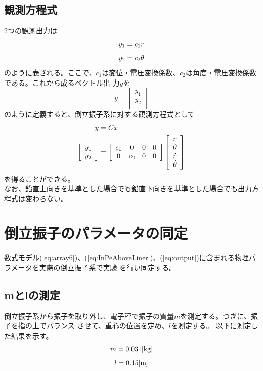 \subsection{観測方程式}
	2つの観測出力は
	\[
		y_{1} = c_{1}r\\
	\]
	\[
		y_{2} = c_{2}\theta\\
	\]
	のように表される。ここで、$c_{1}$は変位・電圧変換係数、$c_{2}$は角度・電圧変換係数である。これから成るベクトル出
	力$y$を\\
	\[
		y=\left[
		\begin{array}{c}
			y_{1}\\
			y_{2}\\
		\end{array}
		\right]
	\]
	のように定義すると、倒立振子系に対する観測方程式として\\
	\begin{align}
		y&=Cx \notag \\
		\left[
		\begin{array}{c}
			y_{1}\\
			y_{2}\\
		\end{array}
		\right]&=\left[
		\begin{array}{cccc}
			c_{1} & 0 & 0 & 0 \\
			0 & c_{2} & 0 & 0\\
		\end{array}
		\right]\left[
		\begin{array}{c}
			r\\
			\theta\\
			\dot{r}\\
			\dot{\theta}\\
		\end{array}
		\right]
		\label{eq:output}
	\end{align}
	を得ることができる。\\
	なお、鉛直上向きを基準とした場合でも鉛直下向きを基準とした場合でも出力方程式は変わらない。
\section{倒立振子のパラメータの同定}
数式モデル(\ref{eq:array6})、(\ref{eq:InPeAboveLiner})、(\ref{eq:output})に含まれる物理パラメータを実際の倒立振子系で実験
を行い同定する。
\subsection{mとlの測定}
	倒立振子系から振子を取り外し、電子秤で振子の質量$m$を測定する。つぎに、振子を指の上でバランス
	させて、重心の位置を定め、$l$を測定する。
	以下に測定した結果を示す。
	\[m = 0.031[\rm{kg}]\]
	\[l = 0.15[\rm{m}]\]

